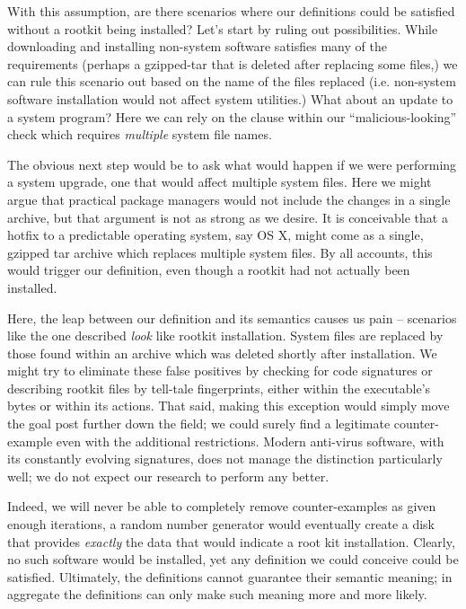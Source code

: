 \documentclass[nocopyrightspace,preprint]{sigplanconf}
\begin{document}
With this assumption, are there scenarios where our definitions could be
satisfied without a rootkit being installed? Let's start by ruling out
possibilities. While downloading and installing non-system software satisfies
many of the requirements (perhaps a gzipped-tar that is deleted after
replacing some files,) we can rule this scenario out based on the name of the
files replaced (i.e. non-system software installation would not affect system
utilities.) What about an update to a system program? Here we can rely on the
clause within our ``malicious-looking'' check which requires {\em multiple}
system file names.

The obvious next step would be to ask what would happen if we were performing
a system upgrade, one that would affect multiple system files. Here we might
argue that practical package managers would not include the changes in a
single archive, but that argument is not as strong as we desire. It is
conceivable that a hotfix to a predictable operating system, say OS X, might
come as a single, gzipped tar archive which replaces multiple system files. By
all accounts, this would trigger our definition, even though a rootkit had
not actually been installed.

Here, the leap between our definition and its semantics causes us pain --
scenarios like the one described {\em look} like rootkit installation. System
files are replaced by those found within an archive which was deleted shortly
after installation. We might try to eliminate these false positives by
checking for code signatures or describing rootkit files by tell-tale
fingerprints, either within the executable's bytes or within its actions. That
said, making this exception would simply move the goal post further down the
field; we could surely find a legitimate counter-example even with the
additional restrictions. Modern anti-virus software, with its constantly
evolving signatures, does not manage the distinction particularly well; we do
not expect our research to perform any better.

Indeed, we will never be able to completely remove counter-examples as given
enough iterations, a random number generator would eventually create a disk
that provides {\em exactly} the data that would indicate a root kit
installation. Clearly, no such software would be installed, yet any definition
we could conceive could be satisfied. Ultimately, the definitions cannot
guarantee their semantic meaning; in aggregate the definitions can only make
such meaning more and more likely.
\end{document}
